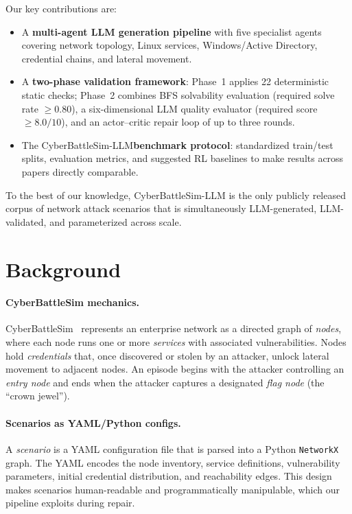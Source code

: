 \documentclass[11pt,a4paper]{article}
\newcommand{\CBS}{CyberBattleSim\xspace}
\newcommand{\CBSL}{CyberBattleSim-LLM\xspace}
\begin{document}
Our key contributions are:
\begin{itemize}
    \item A \textbf{multi-agent LLM generation pipeline} with five specialist
          agents covering network topology, Linux services, Windows/Active
          Directory, credential chains, and lateral movement.
    \item A \textbf{two-phase validation framework}: Phase~1 applies 22
          deterministic static checks; Phase~2 combines BFS solvability
          evaluation (required solve rate $\geq 0.80$), a six-dimensional LLM
          quality evaluator (required score $\geq 8.0/10$), and an
          actor--critic repair loop of up to three rounds.
    \item The \CBSL \textbf{benchmark protocol}: standardized train/test
          splits, evaluation metrics, and suggested RL baselines to make
          results across papers directly comparable.
\end{itemize}

To the best of our knowledge, \CBSL is the only publicly released corpus of
network attack scenarios that is simultaneously LLM-generated,
LLM-validated, and parameterized across scale.

\section{Background}
\label{sec:background}

\paragraph{\CBS mechanics.}
\CBS~\cite{cyberbattlesim2021} represents an enterprise network as a directed
graph of \emph{nodes}, where each node runs one or more \emph{services} with
associated vulnerabilities.  Nodes hold \emph{credentials} that, once
discovered or stolen by an attacker, unlock lateral movement to adjacent
nodes.  An episode begins with the attacker controlling an \emph{entry node}
and ends when the attacker captures a designated \emph{flag node} (the
``crown jewel'').

\paragraph{Scenarios as YAML/Python configs.}
A \emph{scenario} is a YAML configuration file that is parsed into a Python
\texttt{NetworkX} graph.  The YAML encodes the node inventory, service
definitions, vulnerability parameters, initial credential distribution, and
reachability edges.  This design makes scenarios human-readable and
programmatically manipulable, which our pipeline exploits during repair.
\end{document}
